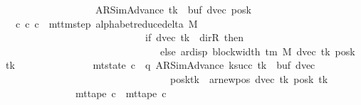\begin{isabellebody}
\ \ \ \ \ \ \ \ \ \ \ \ \ \ \ \ \ \ \ {\isacharparenleft}{\kern0pt}AR{\isacharunderscore}{\kern0pt}SimAdvance{\isacharcomma}{\kern0pt}\ tk{\isacharcomma}{\kern0pt}\ {}{\isacharcomma}{\kern0pt}\ buf{\isacharcomma}{\kern0pt}\ dvec{\isacharcomma}{\kern0pt}\ posk{\isacharparenright}{\kern0pt}{\isachardoublequoteclose}\isanewline
\ \ \ {\isachardoublequoteopen}{\isasymexists}c{\isacharprime}{\kern0pt}{\isachardot}{\kern0pt}\ {\isacharparenleft}{\kern0pt}c{}{\isacharcomma}{\kern0pt}\ c{\isacharprime}{\kern0pt}{\isacharparenright}{\kern0pt}\ {\isasymin}\ {\isacharparenleft}{\kern0pt}mttm{\isacharunderscore}{\kern0pt}step\ {\isacharparenleft}{\kern0pt}alphabet{\isacharunderscore}{\kern0pt}reduce{\isacharunderscore}{\kern0pt}delta\ M{\isacharparenright}{\kern0pt}{\isacharparenright}{\kern0pt}\isanewline
\ \ \ \ \ \ \ \ \ \ \ \ \ \ \ \ \ \ \ \ \ \ \ \ \ \ \ \ {\isacharcircum}{\kern0pt}{\isacharcircum}{\kern0pt}\ {\isacharparenleft}{\kern0pt}if\ dvec\ tk\ {\isacharequal}{\kern0pt}\ dir{\isachardot}{\kern0pt}R\ then\ {}\isanewline
\ \ \ \ \ \ \ \ \ \ \ \ \ \ \ \ \ \ \ \ \ \ \ \ \ \ \ \ \ \ \ \ else\ ar{\isacharunderscore}{\kern0pt}disp\ {\isacharparenleft}{\kern0pt}block{\isacharunderscore}{\kern0pt}width\ {\isacharparenleft}{\kern0pt}{\isasymGamma}{\isacharunderscore}{\kern0pt}tm\ M{\isacharparenright}{\kern0pt}{\isacharparenright}{\kern0pt}\ {\isacharparenleft}{\kern0pt}dvec\ tk{\isacharparenright}{\kern0pt}\ {\isacharparenleft}{\kern0pt}posk\ tk{\isacharparenright}{\kern0pt}{\isacharparenright}{\kern0pt}\isanewline
\ \ \ \ \ \ \ \ \ \ \ \ \ \ {\isasymand}\ mt{\isacharunderscore}{\kern0pt}state\ c{\isacharprime}{\kern0pt}\ {\isacharequal}{\kern0pt}\ {\isacharparenleft}{\kern0pt}q{\isacharcomma}{\kern0pt}\ AR{\isacharunderscore}{\kern0pt}SimAdvance{\isacharcomma}{\kern0pt}\ k{\isacharunderscore}{\kern0pt}succ\ tk{\isacharcomma}{\kern0pt}\ {}{\isacharcomma}{\kern0pt}\ buf{\isacharcomma}{\kern0pt}\ dvec{\isacharcomma}{\kern0pt}\isanewline
\ \ \ \ \ \ \ \ \ \ \ \ \ \ \ \ \ \ \ \ \ \ \ \ \ \ \ \ \ \ \ \ \ \ posk{\isacharparenleft}{\kern0pt}tk\ {\isacharcolon}{\kern0pt}{\isacharequal}{\kern0pt}\ ar{\isacharunderscore}{\kern0pt}newpos\ {\isacharparenleft}{\kern0pt}dvec\ tk{\isacharparenright}{\kern0pt}\ {\isacharparenleft}{\kern0pt}posk\ tk{\isacharparenright}{\kern0pt}{\isacharparenright}{\kern0pt}{\isacharparenright}{\kern0pt}\isanewline
\ \ \ \ \ \ \ \ \ \ \ \ \ \ {\isasymand}\ mt{\isacharunderscore}{\kern0pt}tape\ c{\isacharprime}{\kern0pt}\ {\isacharequal}{\kern0pt}\ mt{\isacharunderscore}{\kern0pt}tape\ c{}\isanewline

\end{isabellebody}

